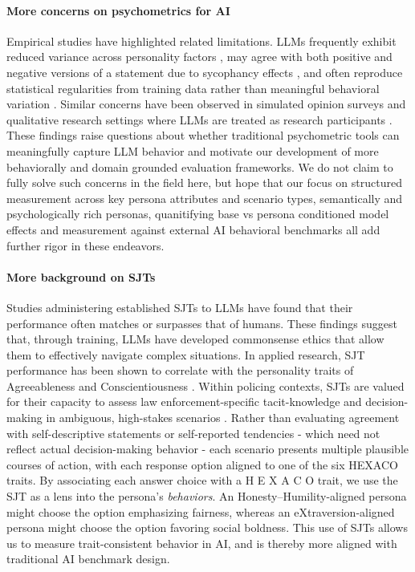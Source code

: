 \documentclass[11pt]{article}
\newcommand{\hexaco}{%
  {\textcolor{hexH}{H}}%
  {\textcolor{hexE}{E}}%
  {\textcolor{hexX}{X}}%
  {\textcolor{hexA}{A}}%
  {\textcolor{hexC}{C}}%
  {\textcolor{hexO}{O}}%
}
\begin{document}
\paragraph{More concerns on psychometrics for AI}
Empirical studies have highlighted related limitations. LLMs frequently exhibit reduced variance across personality factors \citep{problem_variance_1, kwok2024evaluating}, may agree with both positive and negative versions of a statement due to sycophancy effects \citep{problem_agree_both}, and often reproduce statistical regularities from training data rather than meaningful behavioral variation \citep{ma-etal-2025-algorithmic, problem_fidelity_1}. Similar concerns have been observed in simulated opinion surveys \citep{ma-etal-2025-algorithmic, problem_fidelity_3} and qualitative research settings where LLMs are treated as research participants \citep{problem_fidelity_4, problem_research_participants_1, problem_research_participants_2}. These findings raise questions about whether traditional psychometric tools can meaningfully capture LLM behavior and motivate our development of more behaviorally and domain grounded evaluation frameworks. We do not claim to fully solve such concerns in the field here, but hope that our focus on structured measurement across key persona attributes and scenario types, semantically and psychologically rich personas, quanitifying base vs persona conditioned model effects and measurement against external AI behavioral benchmarks all add further rigor in these endeavors.

\paragraph{More background on SJTs}
Studies administering established SJTs to LLMs \cite{mittelstadt2024large, walsh2025using} have found that their performance often matches or surpasses that of humans. These findings suggest that, through training, LLMs have developed commonsense ethics that allow them to effectively navigate complex situations. In applied research, SJT performance has been shown to correlate with the personality traits of \textcolor{hexA}{Agreeableness} and \textcolor{hexC}{Conscientiousness} \cite{cabrera2001situational,de2017scoring}. Within policing contexts, SJTs are valued for their capacity to assess law enforcement-specific tacit-knowledge and decision-making in ambiguous, high-stakes scenarios 
\cite{taylor2013police}. 
Rather than evaluating agreement with self-descriptive statements or self-reported tendencies - which need not reflect actual decision-making behavior - each scenario presents multiple plausible courses of action, with each response option aligned to one of the six HEXACO traits. By associating each answer choice with a \hexaco\; trait, we use the SJT as a lens into the persona’s \textit{behaviors}. An \textcolor{hexH}{\textcolor{hexH}{Honesty–Humility}}-aligned persona might choose the option emphasizing fairness, whereas an \textcolor{hexX}{eXtraversion}-aligned persona might choose the option favoring social boldness. This use of SJTs allows us to measure trait-consistent behavior in AI, and is thereby more aligned with traditional AI benchmark design.
\end{document}
